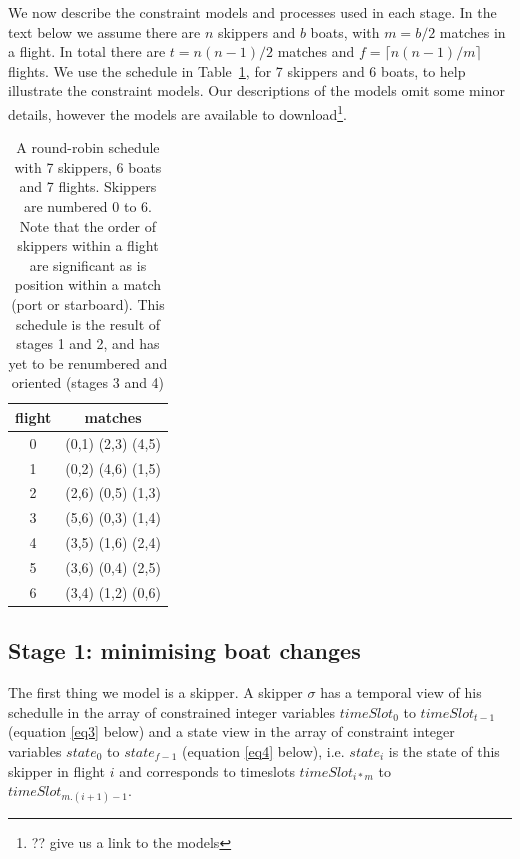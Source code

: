 \documentclass{llncs}
\begin{document}
We now describe the constraint models and processes used in each stage. In the
text below we assume there are $n$ skippers and $b$ boats, with $m = b/2$
matches in a flight. In total there are $t = n(n-1)/2$ matches and $f = \lceil
n(n-1)/m  \rceil$ flights. We use the schedule in Table~\ref{tab1}, for 7
skippers and 6 boats, to help illustrate the constraint models. Our
descriptions of the models omit some minor details, however the models are
available to download\footnote{?? give us a link to the models}.

\begin{table}[h]
\begin{center}
\begin{tabular}{cc} \\ 
flight & matches \\ \hline
0 & (0,1) (2,3) (4,5)  \\
1 & (0,2) (4,6) (1,5)  \\
2 & (2,6) (0,5) (1,3)  \\
3 & (5,6) (0,3) (1,4)  \\
4 & (3,5) (1,6) (2,4)  \\
5 & (3,6) (0,4) (2,5)  \\
6 & (3,4) (1,2) (0,6)  \\ \hline
\end{tabular}
\end{center}
\caption{A round-robin schedule with 7 skippers, 6 boats and 7 flights. Skippers are numbered 0 to 6. Note that the order of skippers within a flight are significant as is position within a match (port or starboard). This schedule is the result of stages 1 and 2, and has yet to be renumbered and oriented (stages 3 and 4)}
\label{tab1}
\end{table}

\subsection{Stage 1: minimising boat changes}
The first thing we model is a skipper. A skipper $\sigma$ has a temporal view of his schedulle in the array of constrained integer variables $timeSlot_{0}$ to $timeSlot_{t-1}$ (equation \ref{eq3} below) and a state view in the array of constraint integer variables $state_{0}$ to $state_{f-1}$ (equation \ref{eq4} below), i.e. $state_{i}$ is the state of this skipper in flight $i$ and corresponds to timeslots $timeSlot_{i*m}$ to $timeSlot_{m.(i+1)-1}$.
\end{document}
